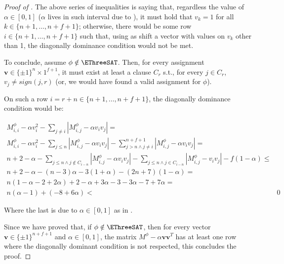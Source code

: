 \begin{proof}[Proof of ]
	The above series of inequalities is saying that, regardless the value of $\alpha\in[0,1]$ ($\alpha$ lives in such interval due to ), it must hold that $v_k = 1$ for all $k\in\{n+1, \dots, n+f+1\}$; otherwise, there would be some row $i\in\{n+1, \dots, n+f+1\}$ such that, using as shift a vector with values on $v_k$ other than 1, the diagonally dominance condition would not be met.

	To conclude, assume $\phi\notin \EThreeSAT$. Then, for every assignment $\mathbf{v}\in\{\pm 1\}^{n}\times 1^{f+1}$, it must exist at least a clause $C_r$ s.t., for every $j\in C_r$, $v_j \neq sign(j,r)$ (or, we would have found a valid assignment for $\phi$).
	
	On such a row $i = r+n \in\{n+1, \dots, n+f+1\}$, the diagonally dominance condition would be:
	
	\begin{align}
		M^\phi_{i,i} - \alpha v_i^2 - \sum_{j\neq i} |M^{\phi}_{i,j} - \alpha v_i v_j| = & \\
		M^\phi_{i,i} - \alpha v_i^2 - \sum_{j\leq n}|M^\phi_{i,j} - \alpha v_i v_j |  - \sum_{j>n\land j\neq i}^{n+f+1} |M^\phi_{i,j} - \alpha v_i v_j| =  & \\
		n+2 - \alpha - \sum_{j\leq n  \land j\notin C_{i-n}}|M^\phi_{i,j} - \alpha v_i v_j | - \sum_{j \leq n \land j\in C_{i-n}}|M^\phi_{i,j} - v_i v_j| - f(1-\alpha) \leq & \\
		n+2 - \alpha - (n-3)\alpha - 3 (1+\alpha) - (2n + 7)(1-\alpha) = & \\
		n(1 - \alpha -2 + 2 \alpha) + 2 - \alpha + 3\alpha - 3 - 3\alpha - 7 + 7 \alpha = & \\
		n(\alpha - 1) + (-8 + 6 \alpha ) < & 0	\label{eq:dd_strict_below_zero}
	\end{align}
	
	Where the last  is due to $\alpha\in[0,1]$ as in .
	
	Since we have proved that, if $\phi\notin\EThreeSAT$, then for every vector $\mathbf{v}\in\{\pm 1\}^{n+f+1}$ and $\alpha \in [0,1]$, the matrix $M^\phi - \alpha \mathbf{vv}^T$ has at least one row where the diagonally dominant condition is not respected, this concludes the proof.
\end{proof}


